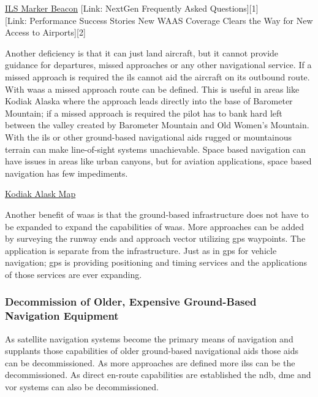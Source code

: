 \href{https://en.wikipedia.org/wiki/Marker_beacon}{ILS Marker Beacon}
{[}Link: NextGen Frequently Asked Questions{]}{[}1{]}\\
{[}Link: Performance Success Stories New WAAS Coverage Clears the Way
for New Access to Airports{]}{[}2{]}

Another deficiency is that it can just land aircraft, but it cannot
provide guidance for departures, missed approaches or any other
navigational service. If a missed approach is required the \ac{ils} cannot aid the aircraft on its outbound route. With
\ac{waas} a missed approach route can be defined. This is useful in areas
like Kodiak Alaska where the approach leads directly into the base of
Barometer Mountain; if a missed approach is required the pilot has to
bank hard left between the valley created by Barometer Mountain and Old
Women's Mountain. With the \ac{ils} or other
ground-based navigational aids rugged or mountainous terrain can make
line-of-sight systems unachievable. Space based navigation can have
issues in areas like urban canyons, but for aviation applications, space
based navigation has few impediments.

\href{https://www.google.com/maps/@57.7483115,-152.5265434,13z/data=!4m3!11m2!2s1o5YgbCjAjyBntt5HWecW-6ByCvg!3e3!5m1!1e4}{Kodiak
Alask Map}

Another benefit of \ac{waas} is that the ground-based infrastructure does not
have to be expanded to expand the capabilities of \ac{waas}. More approaches
can be added by surveying the runway ends and approach vector utilizing
\ac{gps} waypoints. The application is separate from the infrastructure. Just
as in \ac{gps} for vehicle navigation; \ac{gps} is providing positioning and
timing services and the applications of those services are ever
expanding.

\subsubsection{Decommission of Older, Expensive Ground-Based Navigation
Equipment}\label{decommission-of-older-expensive-ground-based-navigation-equipment}

As satellite navigation systems become the primary means of navigation
and supplants those capabilities of older ground-based navigational aids
those aids can be decommissioned. As more approaches are defined more
\acp{ils} can be the decommissioned. As direct en-route capabilities are
established the \ac{ndb}, \ac{dme} and \ac{vor} systems can also be decommissioned.

